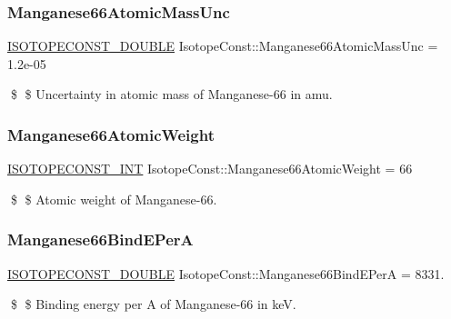 \subsubsection{\texorpdfstring{Manganese66\+Atomic\+Mass\+Unc}{Manganese66AtomicMassUnc}}
{\footnotesize\ttfamily \mbox{\hyperlink{group___isotope_const-_macros_ga8f45a7272ce02c0b4c65c44636ed719a}{I\+S\+O\+T\+O\+P\+E\+C\+O\+N\+S\+T\+\_\+\+D\+O\+U\+B\+LE}} Isotope\+Const\+::\+Manganese66\+Atomic\+Mass\+Unc = 1.\+2e-\/05}

\$ \$ Uncertainty in atomic mass of Manganese-\/66 in amu. \mbox{\label{group___isotope_const-_manganese-_mn66_gab43bf5e3e339155af45b798cebc8571d}} 
\subsubsection{\texorpdfstring{Manganese66\+Atomic\+Weight}{Manganese66AtomicWeight}}
{\footnotesize\ttfamily \mbox{\hyperlink{group___isotope_const-_macros_ga5f18360b3e99483a35c32d789e62621c}{I\+S\+O\+T\+O\+P\+E\+C\+O\+N\+S\+T\+\_\+\+I\+NT}} Isotope\+Const\+::\+Manganese66\+Atomic\+Weight = 66}

\$ \$ Atomic weight of Manganese-\/66. \mbox{\label{group___isotope_const-_manganese-_mn66_ga79d3ca61065e39b68a6835e64c6a9a07}} 
\subsubsection{\texorpdfstring{Manganese66\+Bind\+E\+PerA}{Manganese66BindEPerA}}
{\footnotesize\ttfamily \mbox{\hyperlink{group___isotope_const-_macros_ga8f45a7272ce02c0b4c65c44636ed719a}{I\+S\+O\+T\+O\+P\+E\+C\+O\+N\+S\+T\+\_\+\+D\+O\+U\+B\+LE}} Isotope\+Const\+::\+Manganese66\+Bind\+E\+PerA = 8331.}

\$ \$ Binding energy per A of Manganese-\/66 in keV. \mbox{\label{group___isotope_const-_manganese-_mn66_gae72c89999b3b7cc5f19fbe800809ed0c}} 
